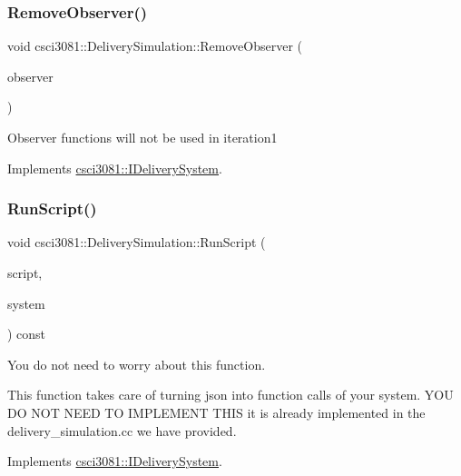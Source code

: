 \subsubsection{\texorpdfstring{Remove\+Observer()}{RemoveObserver()}}
{\footnotesize\ttfamily void csci3081\+::\+Delivery\+Simulation\+::\+Remove\+Observer (\begin{DoxyParamCaption}\item[{\hyperlink{classentity__project_1_1IEntityObserver}{I\+Entity\+Observer} $\ast$}]{observer }\end{DoxyParamCaption})\hspace{0.3cm}{\ttfamily [virtual]}}

Observer functions will not be used in iteration1 

Implements \hyperlink{classcsci3081_1_1IDeliverySystem_a79d4336f9fd4bcb837a5be1713f84ab1}{csci3081\+::\+I\+Delivery\+System}.

\mbox{\label{classcsci3081_1_1DeliverySimulation_a332938cb4b972af169ad58dbc1b3bb05}} 
\subsubsection{\texorpdfstring{Run\+Script()}{RunScript()}}
{\footnotesize\ttfamily void csci3081\+::\+Delivery\+Simulation\+::\+Run\+Script (\begin{DoxyParamCaption}\item[{const picojson\+::array \&}]{script,  }\item[{\hyperlink{classentity__project_1_1IEntitySystem}{I\+Entity\+System} $\ast$}]{system }\end{DoxyParamCaption}) const\hspace{0.3cm}{\ttfamily [virtual]}}



You do not need to worry about this function. 

This function takes care of turning json into function calls of your system. Y\+OU DO N\+OT N\+E\+ED TO I\+M\+P\+L\+E\+M\+E\+NT T\+H\+IS it is already implemented in the delivery\+\_\+simulation.\+cc we have provided. 

Implements \hyperlink{classcsci3081_1_1IDeliverySystem_ae152276130e859b052f1d89417be6fc2}{csci3081\+::\+I\+Delivery\+System}.

